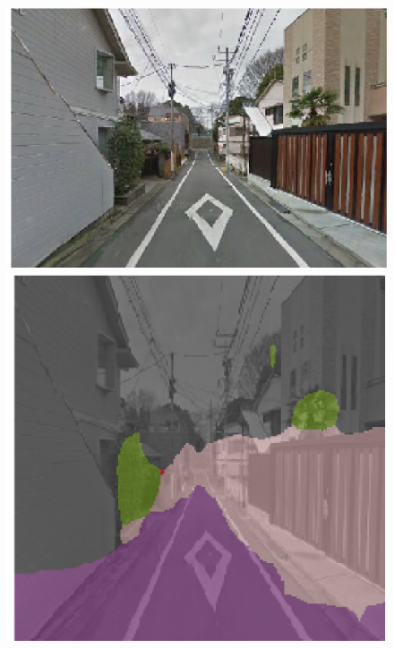 \begin{figure}[!htb]
		\includegraphics[width=\linewidth]{figures/original_sample.png}
	\endminipage\hfill
		\includegraphics[height=\linewidth]{figures/segmentation_sample.png}
	\endminipage\hfill

\end{figure}
